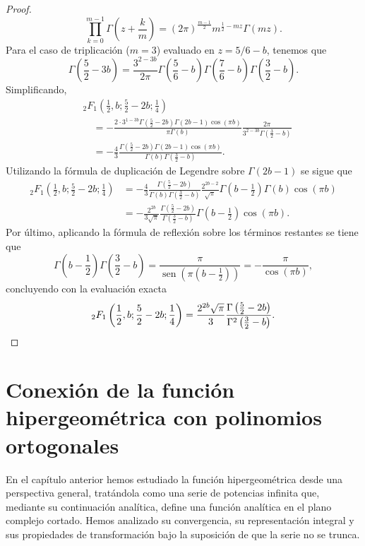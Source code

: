 \documentclass[12pt,a4paper]{book}
\renewcommand{\sin}{\operatorname{sen}}
\begin{document}
\begin{proof}
{\[
\prod_{k=0}^{m-1} \Gamma\left(z + \frac{k}{m}\right) = (2\pi)^{\frac{m-1}{2}} m^{\frac{1}{2} - mz} \Gamma(mz).
\]
} Para el caso de triplicación ($m=3$) evaluado en $z = 5/6 - b$, tenemos que 
\[
\Gamma\left(\frac{5}{2}-3b\right) = \frac{3^{2-3b}}{2\pi} \Gamma\left(\frac{5}{6}-b\right)\Gamma\left(\frac{7}{6}-b\right)\Gamma\left(\frac{3}{2}-b\right).
\]
Simplificando,
\begin{align*}
    & {}_{2}F_{1}\left(\frac{1}{2}, b; \frac{5}{2}-2b; \frac{1}{4}\right) \\
    &\quad = -\frac{2 \cdot 3^{1-3b} \Gamma\left(\frac{5}{2}-2b\right) \Gamma(2b-1) \cos(\pi b)}{\pi \Gamma(b)}  \frac{2\pi}{3^{2-3b} \Gamma\left(\frac{3}{2}-b\right)}  \\
    &\quad = -\frac{4}{3} \frac{\Gamma\left(\frac{5}{2}-2b\right)\Gamma(2b-1)\cos(\pi b)}{\Gamma(b)\Gamma\left(\frac{3}{2}-b\right)}.
\end{align*}
Utilizando la fórmula de duplicación de Legendre sobre $\Gamma(2b-1)$ se sigue que
\begin{align*}
    {}_{2}F_{1}\left(\frac{1}{2}, b; \frac{5}{2}-2b; \frac{1}{4}\right) &= -\frac{4}{3} \frac{\Gamma\left(\frac{5}{2}-2b\right)}{\Gamma(b)\Gamma\left(\frac{3}{2}-b\right)} \frac{2^{2b-2}}{\sqrt{\pi}} \Gamma\left(b-\frac{1}{2}\right)\Gamma(b)  \cos(\pi b) \\
    &= -\frac{2^{2b}}{3\sqrt{\pi}} \frac{\Gamma\left(\frac{5}{2}-2b\right)}{\Gamma\left(\frac{3}{2}-b\right)} \Gamma\left(b-\frac{1}{2}\right) \cos(\pi b).
\end{align*}
Por último, aplicando la fórmula de reflexión sobre los términos restantes se tiene que
\[
\Gamma\left(b-\frac{1}{2}\right)\Gamma\left(\frac{3}{2}-b\right) = \frac{\pi}{\sin\left(\pi\left(b-\frac{1}{2}\right)\right)} = -\frac{\pi}{\cos(\pi b)},
\]
concluyendo con la evaluación exacta
\[
    {}_{2}F_{1}\left(\frac{1}{2}, b; \frac{5}{2}-2b; \frac{1}{4}\right) = \frac{2^{2b}\sqrt{\pi}}{3} \frac{\Gamma\left(\frac{5}{2}-2b\right)}{\Gamma^{2}\left(\frac{3}{2}-b\right)}. \qedhere
\]
\end{proof}


\chapter[Conexión con polinomios ortogonales]{Conexión de la función hipergeométrica con polinomios ortogonales}

En el capítulo anterior hemos estudiado la función hipergeométrica desde una perspectiva general, tratándola como una serie de potencias infinita que, mediante su continuación analítica, define una función analítica en el plano complejo cortado. Hemos analizado su convergencia, su representación integral y sus propiedades de transformación bajo la suposición de que la serie no se trunca.
\end{document}
